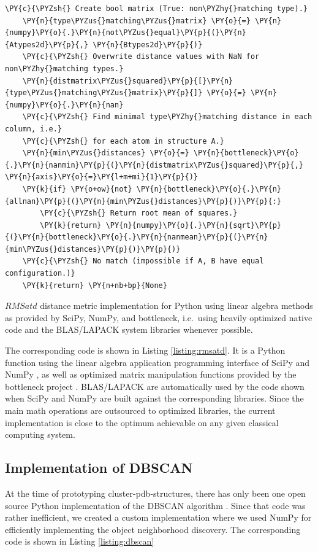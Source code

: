 \begin{listing}
\begin{Verbatim}[fontsize=\tiny,commandchars=\\\{\}]
    \PY{c}{\PYZsh{} Create bool matrix (True: non\PYZhy{}matching type).}
    \PY{n}{type\PYZus{}matching\PYZus{}matrix} \PY{o}{=} \PY{n}{numpy}\PY{o}{.}\PY{n}{not\PYZus{}equal}\PY{p}{(}\PY{n}{Atypes2d}\PY{p}{,} \PY{n}{Btypes2d}\PY{p}{)}
    \PY{c}{\PYZsh{} Overwrite distance values with NaN for non\PYZhy{}matching types.}
    \PY{n}{distmatrix\PYZus{}squared}\PY{p}{[}\PY{n}{type\PYZus{}matching\PYZus{}matrix}\PY{p}{]} \PY{o}{=} \PY{n}{numpy}\PY{o}{.}\PY{n}{nan}
    \PY{c}{\PYZsh{} Find minimal type\PYZhy{}matching distance in each column, i.e.}
    \PY{c}{\PYZsh{} for each atom in structure A.}
    \PY{n}{min\PYZus{}distances} \PY{o}{=} \PY{n}{bottleneck}\PY{o}{.}\PY{n}{nanmin}\PY{p}{(}\PY{n}{distmatrix\PYZus{}squared}\PY{p}{,} \PY{n}{axis}\PY{o}{=}\PY{l+m+mi}{1}\PY{p}{)}
    \PY{k}{if} \PY{o+ow}{not} \PY{n}{bottleneck}\PY{o}{.}\PY{n}{allnan}\PY{p}{(}\PY{n}{min\PYZus{}distances}\PY{p}{)}\PY{p}{:}
        \PY{c}{\PYZsh{} Return root mean of squares.}
        \PY{k}{return} \PY{n}{numpy}\PY{o}{.}\PY{n}{sqrt}\PY{p}{(}\PY{n}{bottleneck}\PY{o}{.}\PY{n}{nanmean}\PY{p}{(}\PY{n}{min\PYZus{}distances}\PY{p}{)}\PY{p}{)}
    \PY{c}{\PYZsh{} No match (impossible if A, B have equal configuration.)}
    \PY{k}{return} \PY{n+nb+bp}{None}
\end{Verbatim}
\caption{$RMSatd$ distance metric implementation for Python using linear algebra
methods as provided by SciPy, NumPy, and bottleneck, i.e.\ using heavily
optimized native code and the BLAS/LAPACK system libraries whenever possible.}
\label{listing:rmsatd}
\end{listing}

The corresponding code is shown in Listing \ref{listing:rmsatd}. It is a Python
function using the linear algebra application programming interface of SciPy and
NumPy \cite{scipy_numpy}, as well as optimized matrix manipulation functions
provided by the bottleneck project \cite{py_bottleneck}. BLAS/LAPACK are
automatically used by the code shown when SciPy and NumPy are built against the
corresponding libraries. Since the main math operations are outsourced to
optimized libraries, the current implementation is close to the optimum
achievable on any given classical computing system.


\subsection{Implementation of DBSCAN}
\label{impl_dbscan}

At the time of prototyping cluster-pdb-structures, there has only been one open
source Python implementation of the DBSCAN algorithm \cite{scikit_learn}. Since
that code was rather inefficient, we created a custom implementation where we
used NumPy \cite{scipy_numpy} for efficiently implementing the object
neighborhood discovery. The corresponding code is shown in Listing
\ref{listing:dbscan}

